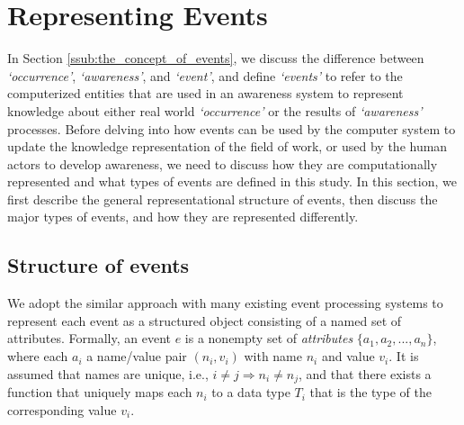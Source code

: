 

\section{Representing Events} %
\label{sec:representing_events}
In Section \ref{ssub:the_concept_of_events}, we discuss the difference between \emph{`occurrence'}, \emph{`awareness'}, and \emph{`event'}, and define \emph{`events'} to refer to the computerized entities that are used in an awareness system to represent knowledge about either real world \emph{`occurrence'} or the results of \emph{`awareness'} processes. Before delving into how events can be used by the computer system to update the knowledge representation of the field of work, or used by the human actors to develop awareness, we need to discuss how they are computationally represented and what types of events are defined in this study. In this section, we first describe the general representational structure of events, then discuss the major types of events, and how they are represented differently.

\subsection{Structure of events} %
\label{sub:defining_events}
We adopt the similar approach with many existing event processing systems \cite{Mhl2010} to represent each event as a structured object consisting of a named set of attributes. Formally, an event $e$ is a nonempty set of \emph{attributes} $\{a_1, a_2, ..., a_n\}$, where each $a_i$ a name/value pair $(n_i, v_i)$ with name $n_i$ and value $v_i$. It is assumed that names are unique, i.e., $i\ne j \Rightarrow n_i\ne n_j$, and that there exists a function that uniquely maps each $n_i$ to a data type $T_i$ that is the type of the corresponding value $v_i$.


